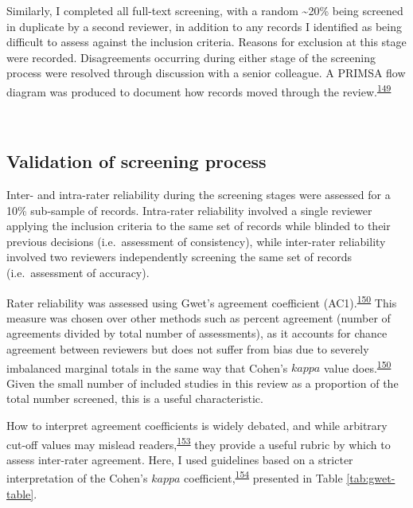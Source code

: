 \documentclass[a4paper, twoside]{templates/ociamthesis}
\begin{document}
Similarly, I completed all full-text screening, with a random \textasciitilde20\% being screened in duplicate by a second reviewer, in addition to any records I identified as being difficult to assess against the inclusion criteria. Reasons for exclusion at this stage were recorded. Disagreements occurring during either stage of the screening process were resolved through discussion with a senior colleague. A PRIMSA flow diagram was produced to document how records moved through the review.\textsuperscript{\protect\hyperlink{ref-page2021}{149}}

~

\hypertarget{validation-of-screening-process}{%
\subsection{Validation of screening process}\label{validation-of-screening-process}}

Inter- and intra-rater reliability during the screening stages were assessed for a 10\% sub-sample of records. Intra-rater reliability involved a single reviewer applying the inclusion criteria to the same set of records while blinded to their previous decisions (i.e.~assessment of consistency), while inter-rater reliability involved two reviewers independently screening the same set of records (i.e.~assessment of accuracy).

Rater reliability was assessed using Gwet's agreement coefficient (AC1).\textsuperscript{\protect\hyperlink{ref-gwet2008}{150}} This measure was chosen over other methods such as percent agreement (number of agreements divided by total number of assessments), as it accounts for chance agreement between reviewers but does not suffer from bias due to severely imbalanced marginal totals in the same way that Cohen's \(kappa\) value does.\textsuperscript{\protect\hyperlink{ref-gwet2008}{150}} Given the small number of included studies in this review as a proportion of the total number screened, this is a useful characteristic.

How to interpret agreement coefficients is widely debated, and while arbitrary cut-off values may mislead readers,\textsuperscript{\protect\hyperlink{ref-brennan1992}{153}} they provide a useful rubric by which to assess inter-rater agreement. Here, I used guidelines based on a stricter interpretation of the Cohen's \(kappa\) coefficient,\textsuperscript{\protect\hyperlink{ref-mchugh2012}{154}} presented in Table \ref{tab:gwet-table}.

~
\end{document}
